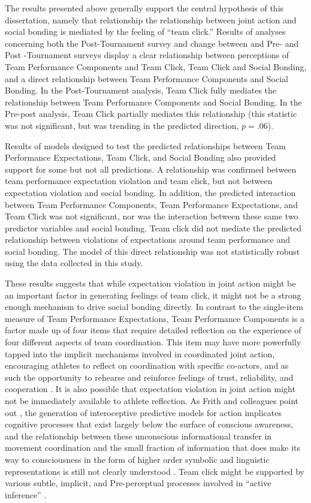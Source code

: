 \begin{CJK}{UTF8}{gbsn}
  The results presented above generally support the central hypothesis of this dissertation, namely that relationship the relationship between joint action and social bonding is mediated by the feeling of ``team click.''  Results of analyses concerning both the Post-Tournament survey and change between and Pre- and Post -Tournament surveys display a clear relationship between perceptions of Team Performance Components and Team Click, Team Click and Social Bonding, and a direct relationship between Team Performance Components and Social Bonding.  In the Post-Tournament analysis, Team Click fully mediates the relationship between Team Performance Components and Social Bonding. In the Pre-post analysis, Team Click partially mediates this relationship (this statistic was not significant, but was trending in the predicted direction, $p = .06$).

  Results of models designed to test the predicted relationships between Team Performance Expectations, Team Click, and Social Bonding also provided support for some but not all predictions. A relationship was confirmed between team performance expectation violation and team click, but not between expectation violation and social bonding. In addition, the predicted interaction between Team Performance Components, Team Performance Expectations, and Team Click was not significant, nor was the interaction between these same two predictor variables and social bonding.  Team click did not mediate the predicted relationship between violations of expectations around team performance and social bonding. The model of this direct relationship was not statistically robust using the data collected in this study.

  These results suggests that while expectation violation in joint action might be an important factor in generating feelings of team click, it might not be a strong enough mechanism to drive social bonding directly.  In contrast to the single-item measure of Team Performance Expectations, Team Performance Components is a factor made up of four items that require detailed reflection on the experience of four different aspects of team coordination.  This item may have more powerfully tapped into the implicit mechanisms involved in coordinated joint action, encouraging athletes to reflect on coordination with specific co-actors, and as such the opportunity to rehearse and reinforce feelings of trust, reliability, and cooperation \citep{Reddish2013a}.  It is also possible that expectation violation in joint action might not be immediately available to athlete reflection.
  As Frith and colleagues point out \textcite{Frith2007,Frith2010,Clark2013}, the generation of interoceptive predictive models for action implicates cognitive processes that exist largely below the surface of conscious awareness, and the relationship between these unconscious informational transfer in movement coordination and the small fraction of information that does make its way to consciousness in the form of higher order symbolic and linguistic representations is still not clearly understood \citep{Semin2008}. Team click might be supported by various subtle, implicit, and Pre-perceptual processes involved in ``active inference'' \citep{Schmidt2011}.


\end{CJK}
